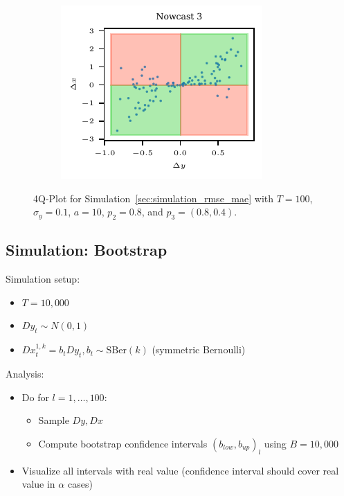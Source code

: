 \documentclass[oneside]{article}
\theoremstyle{plain}%
\theoremstyle{definition}
\newcommand{\ydiff}{D y}
\newcommand{\xdiff}{Dx}
\newcommand{\SBer}{\text{SBer}}
\begin{document}
\begin{figure}
\begin{subfigure}{.32\textwidth}
  	\includegraphics{plots/simulation_same_rmse_mae/4q_plot_3}
  \end{subfigure}
  \caption{4Q-Plot for Simulation~\ref{sec:simulation_rmse_mae} with $T = 100$, $\sigma_y=0.1$, $a = 10$, $p_2 = 0.8$, and $p_3 = (0.8, 0.4)$.}
  \label{fig:simulation_rmse_mae_4q}
\end{figure}

\subsection{Simulation: Bootstrap}

Simulation setup:

\begin{itemize}
  \item $T = 10,000$
  \item $\ydiff_t \sim N(0, 1)$ 
  \item $\xdiff_t^{1, k} = b_t  \ydiff_t, b_t \sim \SBer(k)$ (symmetric Bernoulli)
\end{itemize}

Analysis:
\begin{itemize}
\item Do for $l = 1, \dots, 100$:
\begin{itemize}
  \item Sample $\ydiff, \xdiff$
  \item Compute bootstrap confidence intervals $(b_{low}, b_{up})_l$ using $B = 10,000$
\end{itemize}
  \item Visualize all intervals with real value (confidence interval should cover real value in $\alpha$ cases)
\end{itemize}
\end{document}
